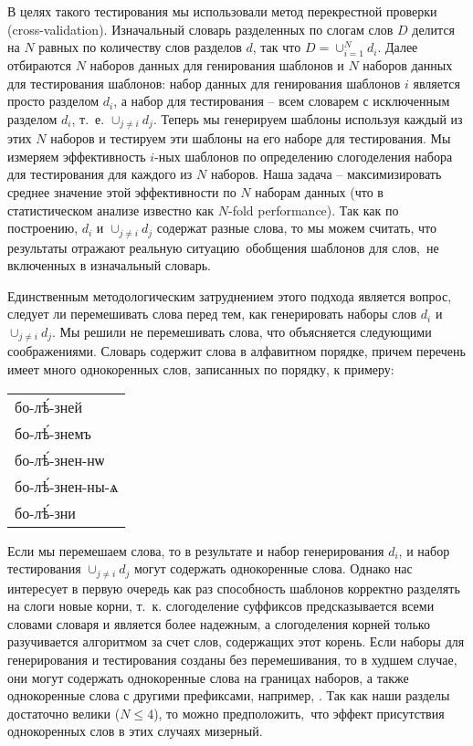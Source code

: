 \documentclass[12pt,a4paper,oneside]{extarticle}
\begin{document}
В целях такого тестирования мы использовали метод перекрестной проверки (\textenglish{cross-validation}). Изначальный словарь разделенных по слогам слов $D$ делится на $N$ равных по количеству слов разделов $d$, так что $D = \cup_{i = 1}^{N} d_i$. Далее отбираются $N$ наборов данных для генирования шаблонов и $N$ наборов данных для тестирования шаблонов: набор данных для генирования шаблонов $i$ является просто разделом $d_i$, а набор для тестирования -- всем словарем с исключенным разделом $d_i$, т.~е. $\cup_{j \neq i} d_j$. Теперь мы генерируем шаблоны используя каждый из этих $N$ наборов и тестируем эти шаблоны на его наборе для тестирования. Мы измеряем эффективность  $i$-ных шаблонов по определению слогоделения набора для тестирования для каждого из $N$ наборов. Наша задача -- максимизировать среднее значение этой эффективности по $N$ наборам данных (что в статистическом анализе известно как \textenglish{$N$-fold performance}). Так как по построению, $d_i$ и $\cup_{j \neq i} d_j$ содержат разные слова, то мы можем считать, что результаты отражают реальную ситуацию обобщения шаблонов для слов, не включенных в изначальный словарь.

Единственным методологическим затруднением этого подхода является вопрос, следует ли перемешивать слова перед тем, как генерировать наборы слов $d_i$ и $\cup_{j \neq i} d_j$. Мы решили не перемешивать слова, что объясняется следующими соображениями. Словарь содержит слова в алфавитном порядке, причем перечень имеет много однокоренных слов, записанных по порядку, к примеру:

\begin{center}
\begin{churchslavonic}
\begin{tabular}{l}
бо-лѣ́-зней \\
бо-лѣ́-знемъ \\
бо-лѣ́-знен-нѡ \\
бо-лѣ́-знен-ны-ѧ \\
бо-лѣ́-зни \\
\end{tabular}
\end{churchslavonic}
\end{center}

\noindent Если мы перемешаем слова, то в результате и набор генерирования $d_i$, и набор тестирования $\cup_{j \neq i} d_j$ могут содержать однокоренные слова. Однако нас интересует в первую очередь как раз способность шаблонов корректно разделять на слоги новые корни, т.~к. слогоделение суффиксов предсказывается всеми словами словаря и является более надежным, а слогоделения корней только разучивается алгоритмом за счет слов, содержащих этот корень. Если наборы для генерирования и тестирования созданы без перемешивания, то в худшем случае, они могут содержать однокоренные слова на границах наборов, а также однокоренные слова с другими префиксами, например, . Так как наши разделы достаточно велики ($N \leq 4$), то можно предположить, что эффект присутствия однокоренных слов в этих случаях мизерный.
\end{document}
